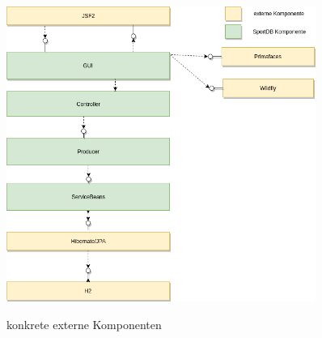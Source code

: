 \begin{figure}[H]
	\caption{konkrete externe Komponenten}
	\includegraphics[width=0.9\textwidth]{content/pictures/externdiagram}
	\label{pic:concrete_component_diag}
\end{figure}


